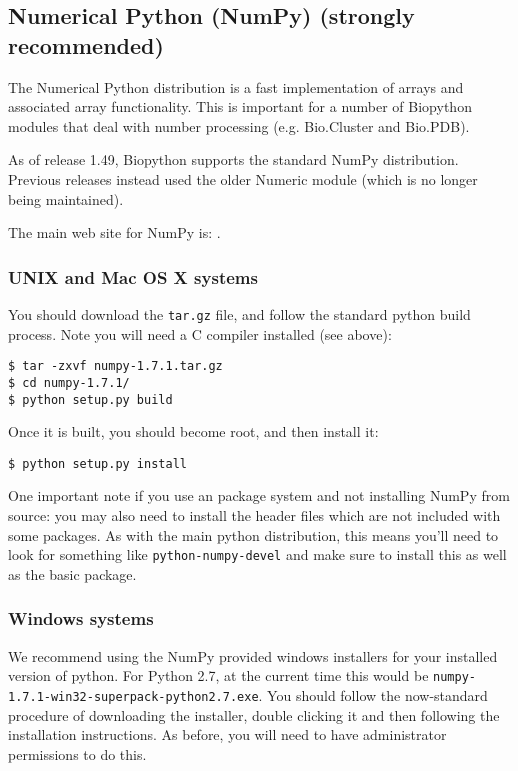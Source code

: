 \documentclass{article}
\begin{document}
\subsection{Numerical Python (NumPy) (strongly recommended)}

The Numerical Python distribution is a fast implementation of arrays and
associated array functionality. This is important for a number of Biopython
modules that deal with number processing (e.g. Bio.Cluster and Bio.PDB).

As of release 1.49, Biopython supports the standard NumPy distribution.
Previous releases instead used the older Numeric module (which is no
longer being maintained).

The main web site for NumPy is:
.

\subsubsection{UNIX and Mac OS X systems}

You should download the \verb|tar.gz| file, and follow the standard python
build process. Note you will need a C compiler installed (see above):

\begin{verbatim}
$ tar -zxvf numpy-1.7.1.tar.gz
$ cd numpy-1.7.1/
$ python setup.py build
\end{verbatim}

Once it is built, you should become root, and then install it:

\begin{verbatim}
$ python setup.py install
\end{verbatim}

One important note if you use an package system and not installing
NumPy from source: you may also need to
install the header files which are not included with some
packages. As with the main python distribution, this means
you'll need to look for something like \verb|python-numpy-devel| 
and make sure to install this as well as the basic package.

\subsubsection{Windows systems}

We recommend using the NumPy provided windows installers for your installed
version of python. For Python 2.7, at the current time this would be
\verb|numpy-1.7.1-win32-superpack-python2.7.exe|. You should follow the 
now-standard procedure of downloading the installer, double
clicking it and then following the installation instructions. As before,
you will need to have administrator permissions to do this.
\end{document}
